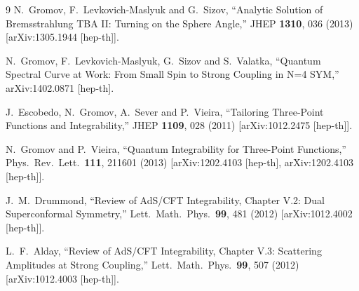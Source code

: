 \documentclass[a4paper]{article}
\numberwithin{equation}{section}
\begin{document}
\begin{thebibliography} {9}
  N.~Gromov, F.~Levkovich-Maslyuk and G.~Sizov,
  ``Analytic Solution of Bremsstrahlung TBA II: Turning on the Sphere Angle,''
  JHEP {\bf 1310}, 036 (2013)
  [arXiv:1305.1944 [hep-th]].
  
  N.~Gromov, F.~Levkovich-Maslyuk, G.~Sizov and S.~Valatka,
  ``Quantum Spectral Curve at Work: From Small Spin to Strong Coupling in N=4 SYM,''
  arXiv:1402.0871 [hep-th].
  
  J.~Escobedo, N.~Gromov, A.~Sever and P.~Vieira,
  ``Tailoring Three-Point Functions and Integrability,''
  JHEP {\bf 1109}, 028 (2011)
  [arXiv:1012.2475 [hep-th]].
  
  N.~Gromov and P.~Vieira,
  ``Quantum Integrability for Three-Point Functions,''
  Phys.\ Rev.\ Lett.\  {\bf 111}, 211601 (2013)
  [arXiv:1202.4103 [hep-th], arXiv:1202.4103 [hep-th]].
  
  J.~M.~Drummond,
  ``Review of AdS/CFT Integrability, Chapter V.2: Dual Superconformal Symmetry,''
  Lett.\ Math.\ Phys.\  {\bf 99}, 481 (2012)
  [arXiv:1012.4002 [hep-th]].
  
  L.~F.~Alday,
  ``Review of AdS/CFT Integrability, Chapter V.3: Scattering Amplitudes at Strong Coupling,''
  Lett.\ Math.\ Phys.\  {\bf 99}, 507 (2012)
  [arXiv:1012.4003 [hep-th]].
  
\end{thebibliography}
  
\end{document}
